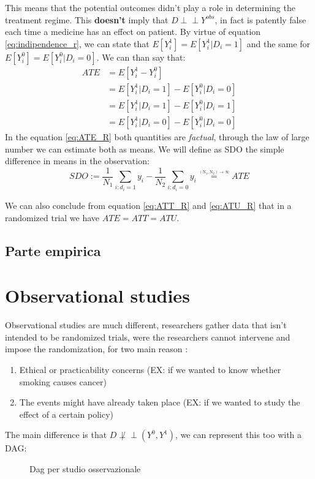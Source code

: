This means that the potential outcomes didn't play a role in determining the treatment regime. This \textbf{doesn't} imply that $D \perp\!\!\!\perp Y^{obs}$, in fact is patently false each time a medicine has an effect on patient. By virtue of equation \ref{eq:indipendence_r}, we can state that $E[Y^1_i] = E[Y^{1}_i | D_i = 1]  $ and the same for $E[Y^0_i] = E[Y^{0}_i | D_i = 0] $.
We can than say that:
\begin{align}
ATE &= E[Y^1_i-Y^0_i ] \\ 
 &= E[Y^{1}_i | D_i = 1]- E[Y^{0}_i | D_i = 0]\label{eq:ATE_R} \\
	& =E[Y^{1}_i | D_i = 1]- E[Y^{0}_i | D_i = 1] \label{eq:ATT_R} \\
 &= E[Y^{1}_i | D_i = 0]- E[Y^{0}_i | D_i = 0] \label{eq:ATU_R}
  \end{align}
In the equation \ref{eq:ATE_R} both quantities are \textit{factual}, through the law of large number we can estimate both as means. We will define as SDO the simple difference in means in the observation:
$$SDO := \frac{1}{N_1}\sum_{i:d_i=1}y_i - \frac{1}{N_2}\sum_{i:d_i=0}y_i \overset{\underset{\mathrm{(N_1, N_2) \rightarrow \infty}}{}}{=} ATE$$

We can also conclude from equation \ref{eq:ATT_R} and \ref{eq:ATU_R} that in a randomized trial we have $ATE = ATT = ATU$.
\subsection{Parte empirica}

\section{Observational studies} %
Observational studies are much different, researchers gather data that isn't intended to be randomized trials, were the researchers cannot intervene and impose the randomization, for two main reason :
\begin{enumerate}
\item Ethical or practicability concerns  (EX: if we wanted to know whether smoking causes cancer)
\item The events might have already taken place  (EX: if we wanted to study the effect of a certain policy)
\end{enumerate}

The main difference is that $D \not \perp\!\!\!\perp (Y^{0},Y^{1})$, we can represent this too with a DAG:
\begin{figure}[!h]
\centering
\caption{Dag per studio osservazionale}
\label{fig:dag_OBS}
\end{figure}